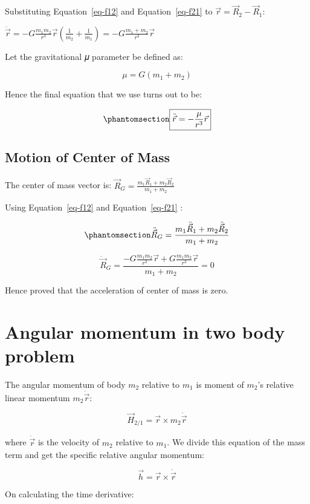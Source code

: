 \documentclass[
  letterpaper,
  DIV=11,
  numbers=noendperiod]{scrreprt}
\begin{document}
Substituting Equation~\ref{eq-f12} and Equation~\ref{eq-f21} to
\(\vec{r}= \vec{R}_2-\vec{R}_1\):

\(\ddot{\vec{r}}= -G\frac{m_1 m_2}{r^3}\vec{r}\left(\frac{1}{m_2}+\frac{1}{m_1}\right)= -G \frac{m_1+m_2}{r^3} \vec{r}\)

Let the gravitational 𝜇 parameter be defined as:

\[
\mu= G(m_1+m_2)
\]

Hence the final equation that we use turns out to be:

\begin{equation}\phantomsection\label{eq-relmotion}{
\boxed{\ddot{\vec{r}}=-\frac{\mu}{r^3}\vec{r}}
}\end{equation}

\subsection{Motion of Center of Mass}\label{motion-of-center-of-mass}

The center of mass vector is:
\(\vec{R}_G=\frac{m_1\vec{R}_1+m_2\vec{R}_2}{m_1+m_2}\)

Using Equation~\ref{eq-f12} and Equation~\ref{eq-f21} :

\begin{equation}\phantomsection\label{eq-com}{
\ddot{\vec{R}}_G= \frac{m_1\ddot{\vec{R}}_1+m_2\ddot{\vec{R}}_2}{m_1+m_2}
}\end{equation}

\[
\ddot{\vec{R}}_G=\frac{-G\frac{m_1m_2}{r^3}\vec{r}+G\frac{m_1m_2}{r^3}\vec{r}}{m_1+m_2}=0
\]

Hence proved that the acceleration of center of mass is zero.

\section{Angular momentum in two body problem}\label{sec-angularmom}

The angular momentum of body \(m_2\) relative to \(m_1\) is moment of
\(m_2\)'s relative linear momentum \(m_2 \dot{\vec{r}}\):

\[
\vec{H}_{2/1}= \vec{r} \times m_2\dot{\vec{r}}
\]

where \(\dot{\vec{r}}\) is the velocity of \(m_2\) relative to \(m_1\).
We divide this equation of the mass term and get the specific relative
angular momentum:

\[
\vec{h}= \vec{r}\times\dot{\vec{r}}
\]

On calculating the time derivative:
\end{document}

